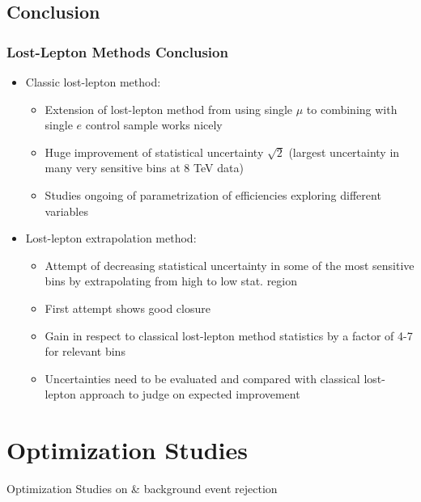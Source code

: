 \documentclass{beamer}
\begin{document}
\subsection{Conclusion}
\begin{frame}
 \frametitle{Lost-Lepton Methods Conclusion}
 \begin{itemize}
 \item Classic lost-lepton method:
 \begin{itemize}
  \item Extension of lost-lepton method from using single $\mu$ to combining with single $e$ control sample works nicely
  \item Huge improvement of statistical uncertainty $\sqrt{2}$ (largest uncertainty in many very sensitive bins at 8 TeV data)
  \item Studies ongoing of parametrization of efficiencies exploring different variables
 \end{itemize}
 \item Lost-lepton extrapolation method:
 \begin{itemize}
  \item Attempt of decreasing statistical uncertainty in some of the most sensitive bins by extrapolating from high to low stat. region
  \item First attempt shows good closure
  \item Gain in respect to classical lost-lepton method statistics by a factor of 4-7 for relevant bins
  \item Uncertainties need to be evaluated and compared with classical lost-lepton approach to judge on expected improvement
 \end{itemize}

 \end{itemize}

\end{frame}


\section{Optimization Studies}
  \begin{frame}
  \begin{center}
    {
     \large Optimization Studies on \ttbar \& \wpj background event rejection}
  \end{center}
\end{frame}
\end{document}
